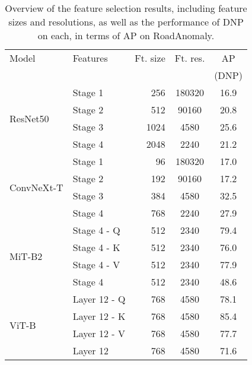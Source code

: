 \documentclass[10pt,twocolumn,letterpaper]{article}
\begin{document}
\begin{table}[h]
\small
\centering
\setlength\tabcolsep{5pt} \begin{tabular}{llrc|c}
        \toprule
        Model & Features & Ft. size & Ft. res. & AP \\
        & & & & (DNP) \\
        \midrule
        \multirow{4}{*}{ResNet50}   & Stage 1 & 256  & 180320 & 16.9 \\
                                    & Stage 2 & 512  & \hphantom{0}90160 & 20.8 \\
                                    & Stage 3 & 1024 & 4580& 25.6 \\
                                    & Stage 4 & 2048 & 2240& 21.2 \\
        \midrule
        \multirow{4}{*}{ConvNeXt-T} & Stage 1 & 96   & 180320 & 17.0 \\
                                    & Stage 2 & 192  & \hphantom{0}90160 & 17.2 \\ 
                                    & Stage 3 & 384  & 4580& 32.5 \\ 
                                    & Stage 4 & 768  & 2240& 27.9 \\
        \midrule                            
        \multirow{4}{*}{MiT-B2} & Stage 4 - Q & 512 & 2340 & 79.4 \\
                                & Stage 4 - K & 512 & 2340 & 76.0 \\
                                & Stage 4 - V & 512 & 2340 & 77.9 \\
                                & Stage 4     & 512 & 2340 & 48.6 \\
        \midrule 
        \multirow{4}{*}{ViT-B}  & Layer 12 - Q & 768 & 4580 & 78.1 \\
                                & Layer 12 - K & 768 & 4580 & 85.4 \\
                                & Layer 12 - V & 768 & 4580 & 77.7 \\
                                & Layer 12     & 768 & 4580 & 71.6 \\
        \bottomrule
    \end{tabular}
    \caption{Overview of the feature selection results, including feature sizes and resolutions, as well as the performance of DNP on each, in terms of AP on RoadAnomaly.}
    \label{tab:feature_selection}
\end{table}
\end{document}

